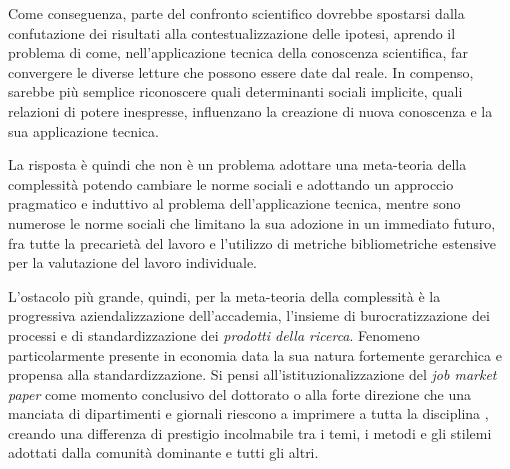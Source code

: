 \documentclass[a4paper, headings=standardclasses]{scrartcl}
\begin{document}
Come conseguenza, parte del confronto scientifico dovrebbe spostarsi dalla confutazione dei risultati alla contestualizzazione delle ipotesi, aprendo il problema di come, nell'applicazione tecnica della conoscenza scientifica, far convergere le diverse letture che possono essere date dal reale.
In compenso, sarebbe più semplice riconoscere quali determinanti sociali implicite, quali relazioni di potere inespresse, influenzano la creazione di nuova conoscenza e la sua applicazione tecnica.

La risposta è quindi che non è un problema adottare una meta-teoria della complessità potendo cambiare le norme sociali e adottando un approccio pragmatico e induttivo al problema dell'applicazione tecnica, mentre sono numerose le norme sociali che limitano la sua adozione in un immediato futuro, fra tutte la precarietà del lavoro e l'utilizzo di metriche bibliometriche estensive per la valutazione del lavoro individuale.

L'ostacolo più grande, quindi, per la meta-teoria della complessità è la progressiva aziendalizzazione dell'accademia, l'insieme di burocratizzazione dei processi e di standardizzazione dei \textit{prodotti della ricerca}. 
Fenomeno particolarmente presente in economia data la sua natura fortemente gerarchica e propensa alla standardizzazione. Si pensi all'istituzionalizzazione del \textit{job market paper} come momento conclusivo del dottorato o alla forte direzione che una manciata di dipartimenti e giornali riescono a imprimere a tutta la disciplina \parencite{heckman2020, aistleitner2023}, creando una differenza di prestigio incolmabile tra i temi, i metodi e gli stilemi adottati dalla comunità dominante e tutti gli altri.

\begin{refcontext}[sorting=nyt]
	\printbibliography
\end{refcontext}
\end{document}
